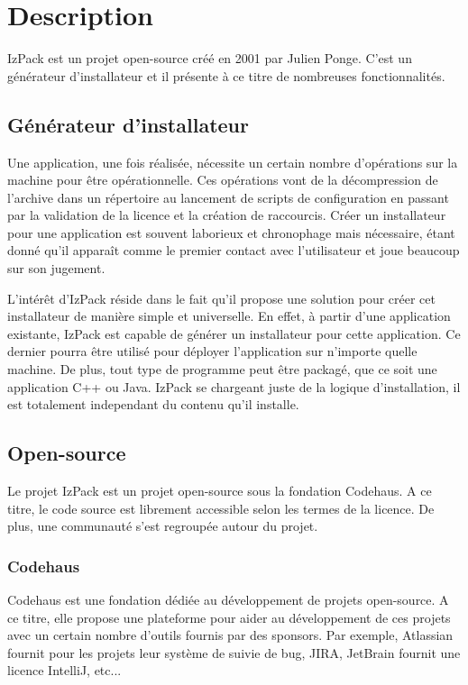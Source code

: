 \section{Description}
IzPack est un projet open-source créé en 2001 par Julien Ponge.
C'est un générateur d'installateur et il présente à ce titre de nombreuses fonctionnalités.
\subsection{Générateur d'installateur}
Une application, une fois réalisée, nécessite un certain nombre d'opérations sur la machine pour être opérationnelle.
Ces opérations vont de la décompression de l'archive dans un répertoire au lancement de scripts de configuration en passant par la validation de la licence et la création de raccourcis.
Créer un installateur pour une application est souvent laborieux et chronophage mais nécessaire, étant donné qu'il apparaît comme le premier contact avec l'utilisateur et joue beaucoup sur son jugement.

L'intérêt d'IzPack réside dans le fait qu'il propose une solution pour créer cet installateur de manière simple et universelle.
En effet, à partir d'une application existante, IzPack est capable de générer un installateur pour cette application.
Ce dernier pourra être utilisé pour déployer l'application sur n'importe quelle machine.
De plus, tout type de programme peut être packagé, que ce soit une application C++ ou Java. IzPack se chargeant juste de la logique d'installation, il est totalement independant du contenu qu'il installe.
\subsection{Open-source}
Le projet IzPack est un projet open-source sous la fondation Codehaus.
A ce titre, le code source est librement accessible selon les termes de la licence. De plus, une communauté s'est regroupée autour du projet.
\subsubsection{Codehaus}
Codehaus est une fondation dédiée au développement de projets open-source.
A ce titre, elle propose une plateforme pour aider au développement de ces projets avec un certain nombre d'outils fournis par des sponsors.
Par exemple, Atlassian fournit pour les projets leur système de suivie de bug, JIRA, JetBrain fournit une licence IntelliJ, etc...
